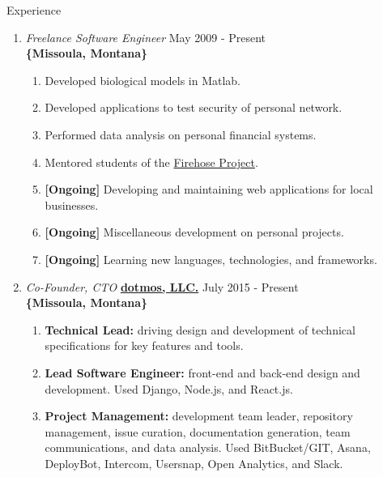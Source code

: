 \documentclass[oneside]{article}%
\begin{document}
 
\onecolumn


\renewcommand{\footrulewidth}{1pt}


\noindent
\huge{Experience}
\small
\begin{enumerate}[]
	\item \textit{Freelance Software Engineer} \hfill May 2009 - Present\\
		\textbf{\{Missoula, Montana\}}
		\begin{enumerate}[*]
			\item Developed biological models in Matlab.
			\item Developed applications to test security of personal network.
			\item Performed data analysis on personal financial systems.
			\item Mentored students of the \href{https://www.thefirehoseproject.com/}{Firehose Project}.
			\item \textbf{[Ongoing]} Developing and maintaining web applications for local businesses.
			\item \textbf{[Ongoing]} Miscellaneous development on personal projects.
			\item \textbf{[Ongoing]} Learning new languages, technologies, and frameworks.
		\end{enumerate}
	\item \textit{Co-Founder, CTO} \textbf{\href{https://dotmos.com}{dotmos, LLC.}} \hfill July 2015 - Present\\
		\textbf{\{Missoula, Montana\}}
		\begin{enumerate}[*]
			\item \textbf{Technical Lead:} driving design and development of technical specifications for key features and tools.
			\item \textbf{Lead Software Engineer:} front-end and back-end design and development. Used Django, Node.js, and React.js.
			\item \textbf{Project Management:} development team leader, repository management, issue curation, documentation generation, team communications, and data analysis. Used BitBucket/GIT, Asana, DeployBot, Intercom, Usersnap, Open Analytics, and Slack.

\end{enumerate}
\end{enumerate}
\end{document}
